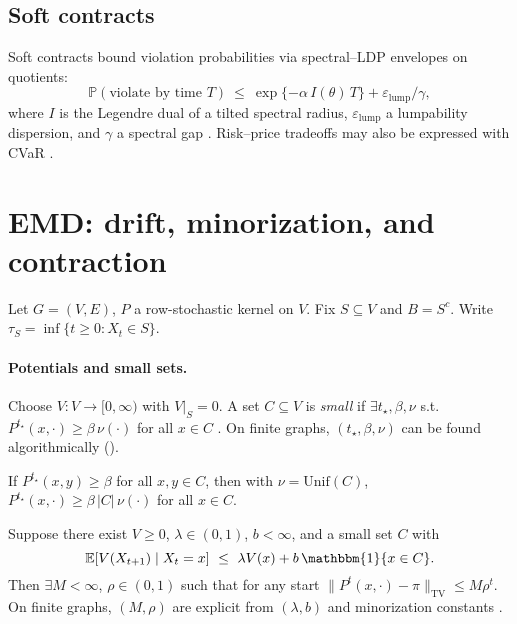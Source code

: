 \documentclass[11pt]{article}
\newcommand{\E}{\mathbb{E}}
\newcommand{\Prob}{\mathbb{P}}
\newcommand{\TV}{\mathrm{TV}}
\newcommand{\1}{\mathbbm{1}}
\begin{document}
\subsection{Soft contracts}\label{sec:soft}
Soft contracts bound violation probabilities via spectral–LDP envelopes on quotients:
\[
\Prob(\text{violate by time }T)\ \le\ \exp\{-\alpha\, I(\theta)\,T\} + \varepsilon_{\text{lump}}/\gamma,
\]
where $I$ is the Legendre dual of a tilted spectral radius, $\varepsilon_{\text{lump}}$ a lumpability dispersion, and $\gamma$ a spectral gap \parencite{DemboZeitouni1998,elliott2025qfi}. Risk–price tradeoffs may also be expressed with CVaR \parencite{RockafellarUryasev2000}.

\section{EMD: drift, minorization, and contraction}\label{sec:emd}
Let $G=(V,E)$, $P$ a row-stochastic kernel on $V$. Fix $S\subseteq V$ and $B=S^c$. Write $\tau_S=\inf\{t\ge 0: X_t\in S\}$.

\paragraph{Potentials and small sets.}
Choose $V:V\to[0,\infty)$ with $V|_S=0$. A set $C\subseteq V$ is \emph{small} if $\exists t_\star,\beta,\nu$ s.t.\ $P^{t_\star}(x,\cdot)\ge \beta\,\nu(\cdot)$ for all $x\in C$ \parencite{Nummelin1984,RobertsRosenthal2004}. On finite graphs, $(t_\star,\beta,\nu)$ can be found algorithmically ().

\begin{lemma}\label{lem:minor}
If $P^{t_\star}(x,y)\ge \beta$ for all $x,y\in C$, then with $\nu=\mathrm{Unif}(C)$, $P^{t_\star}(x,\cdot)\ge \beta\,|C|\,\nu(\cdot)$ for all $x\in C$.
\end{lemma}

\begin{theorem}\label{thm:harris}
Suppose there exist $V\ge 0$, $\lambda\in(0,1)$, $b<\infty$, and a small set $C$ with
\[
\E\!\left[V(X_{t+1})\mid X_t=x\right]\ \le\ \lambda V(x)+b\,\1\{x\in C\}.
\]
Then $\exists M<\infty$, $\rho\in(0,1)$ such that for any start
\(
\|P^t(x,\cdot)-\pi\|_{\TV}\le M\rho^t.
\)
On finite graphs, $(M,\rho)$ are explicit from $(\lambda,b)$ and minorization constants \parencite{MeynTweedie2009,Baxendale2005,RobertsRosenthal2004}.
\end{theorem}
\end{document}
